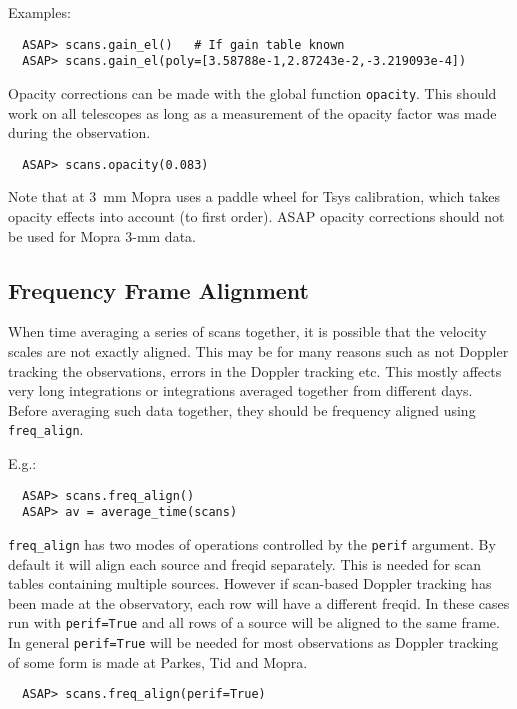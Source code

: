 \documentclass[11pt]{article}
\newcommand{\cmd}[1]{{\tt #1}}
\begin{document}
Examples:

\begin{verbatim}
  ASAP> scans.gain_el()   # If gain table known
  ASAP> scans.gain_el(poly=[3.58788e-1,2.87243e-2,-3.219093e-4])
\end{verbatim}

Opacity corrections can be made with the global function
\cmd{opacity}. This should work on all telescopes as long as a
measurement of the opacity factor was made during the observation.

\begin{verbatim}
  ASAP> scans.opacity(0.083)
\end{verbatim}

Note that at 3~mm Mopra uses a paddle wheel for Tsys calibration,
which takes opacity effects into account (to first order). ASAP
opacity corrections should not be used for Mopra 3-mm data.

\subsection{Frequency Frame Alignment}

When time averaging a series of scans together, it is possible that
the velocity scales are not exactly aligned.  This may be for many
reasons such as not Doppler tracking the observations, errors in the
Doppler tracking etc.  This mostly affects very long integrations or
integrations averaged together from different days.  Before averaging
such data together, they should be frequency aligned using
\cmd{freq\_align}.

E.g.:

\begin{verbatim}
  ASAP> scans.freq_align()
  ASAP> av = average_time(scans)
\end{verbatim}

\cmd{freq\_align} has two modes of operations controlled by the
\cmd{perif} argument. By default it will align each source and freqid
separately. This is needed for scan tables containing multiple
sources. However if scan-based Doppler tracking has been made at the observatory,
each row will have a different freqid. In these cases run with
\cmd{perif=True} and all rows of a source will be aligned to the same
frame. In general \cmd{perif=True} will be needed for most
observations as Doppler tracking of some form is made at Parkes, Tid
and Mopra.

\begin{verbatim}
  ASAP> scans.freq_align(perif=True)
\end{verbatim}
\end{document}

